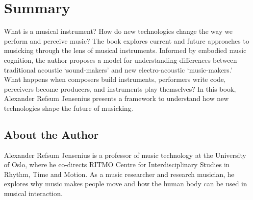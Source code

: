 \chapter*{Summary}

What is a musical instrument? How do new technologies change the way we perform and perceive music? The book explores current and future approaches to musicking through the lens of musical instruments. Informed by embodied music cognition, the author proposes a model for understanding differences between traditional acoustic `sound-makers' and new electro-acoustic `music-makers.' What happens when composers build instruments, performers write code, perceivers become producers, and instruments play themselves? In this book, Alexander Refsum Jensenius presents a framework to understand how new technologies shape the future of musicking.


\section{About the Author}

Alexander Refsum Jensenius is a professor of music technology at the University of Oslo, where he co-directs RITMO Centre for Interdisciplinary Studies in Rhythm, Time and Motion. As a music researcher and research musician, he explores why music makes people move and how the human body can be used in musical interaction.
